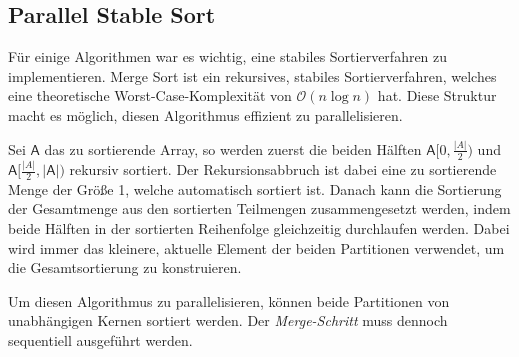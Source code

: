 \subsection{Parallel Stable Sort}
\label{section:pss}

Für einige Algorithmen war es wichtig, eine stabiles Sortierverfahren zu implementieren.
Merge Sort ist ein rekursives, stabiles Sortierverfahren, welches eine theoretische Worst-Case-Komplexität von $\mathcal O (n \log n)$ hat.
Diese Struktur macht es möglich, diesen Algorithmus effizient zu parallelisieren.

Sei $\mathsf A$ das zu sortierende Array, so werden zuerst die beiden
Hälften $\mathsf A[0, \frac{|A|}{2})$ und $\mathsf A[\frac{|A|}{2}, |\mathsf A|)$ rekursiv sortiert.
Der Rekursionsabbruch ist dabei eine zu sortierende Menge der Größe 1, welche automatisch sortiert ist.
Danach kann die Sortierung der Gesamtmenge aus den sortierten Teilmengen zusammengesetzt werden,
indem beide Hälften in der sortierten Reihenfolge gleichzeitig durchlaufen werden.
Dabei wird immer das kleinere, aktuelle Element der beiden Partitionen verwendet,
um die Gesamtsortierung zu konstruieren.

Um diesen Algorithmus zu parallelisieren,
können beide Partitionen von unabhängigen Kernen sortiert werden.
Der \emph{Merge-Schritt} muss dennoch sequentiell ausgeführt werden.